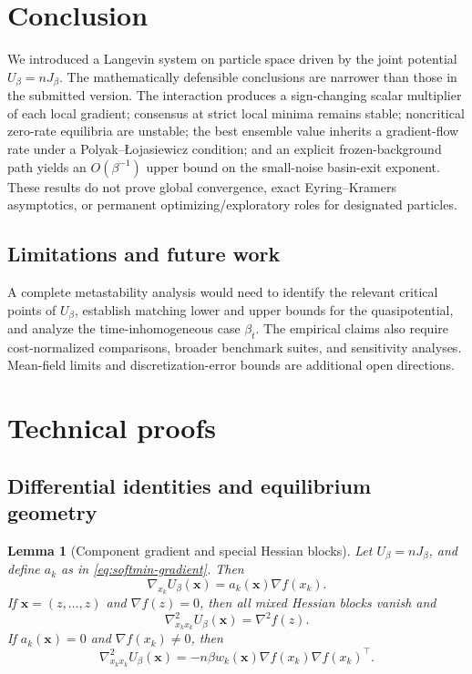 \documentclass{article}
\theoremstyle{plain}
\newtheorem{lemma}[theorem]{Lemma}
\theoremstyle{definition}
\theoremstyle{remark}
\begin{document}
\section{Conclusion}
We introduced a Langevin system on particle space driven by the joint potential \(U_\beta=nJ_\beta\).  The mathematically defensible conclusions are narrower than those in the submitted version.  The interaction produces a sign-changing scalar multiplier of each local gradient; consensus at strict local minima remains stable; noncritical zero-rate equilibria are unstable; the best ensemble value inherits a gradient-flow rate under a Polyak--\L{}ojasiewicz condition; and an explicit frozen-background path yields an \(O(\beta^{-1})\) upper bound on the small-noise basin-exit exponent.  These results do not prove global convergence, exact Eyring--Kramers asymptotics, or permanent optimizing/exploratory roles for designated particles.

\subsection{Limitations and future work}
A complete metastability analysis would need to identify the relevant critical points of \(U_\beta\), establish matching lower and upper bounds for the quasipotential, and analyze the time-inhomogeneous case \(\beta_t\).  The empirical claims also require cost-normalized comparisons, broader benchmark suites, and sensitivity analyses.  Mean-field limits and discretization-error bounds are additional open directions.

  
  

\newpage
\appendix
\onecolumn
\section{Technical proofs}
\label{apx:technical-proofs}

\subsection{Differential identities and equilibrium geometry}

\begin{lemma}[Component gradient and special Hessian blocks]
\label{lem:derivative-of-J-proof}
Let \(U_\beta=nJ_\beta\), and define \(a_k\) as in \eqref{eq:softmin-gradient}.  Then
\[
 \nabla_{x_k}U_\beta(\mathbf{x})=a_k(\mathbf{x})\nabla f(x_k).
\]
If \(\mathbf{x}=(z,\ldots,z)\) and \(\nabla f(z)=0\), then all mixed Hessian blocks vanish and
\[
 \nabla^2_{x_kx_k}U_\beta(\mathbf{x})=\nabla^2f(z).
\]
If \(a_k(\mathbf{x})=0\) and \(\nabla f(x_k)\neq0\), then
\[
 \nabla^2_{x_kx_k}U_\beta(\mathbf{x})
 =-n\beta w_k(\mathbf{x})\nabla f(x_k)\nabla f(x_k)^\top.
\]
\end{lemma}
\end{document}
